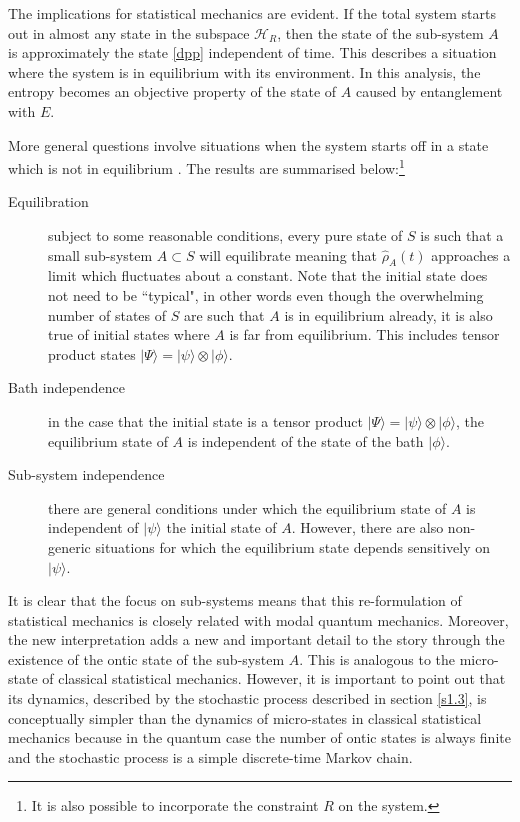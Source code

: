 \documentclass[%
preprint,
nofootinbib,
 amsmath,amssymb,
aps,
]{revtex4-1}
\def\BA{A}
\def\BH{{\mathscr H}}
\def\ket#1{| #1\rangle}
\begin{document}
The implications for statistical mechanics are evident. If the total system starts out in almost any state in the subspace $\BH_R$, then the state of the sub-system $\BA$ is approximately the state \eqref{dpp} independent of time. This describes a situation where the system is in equilibrium with its environment. In this analysis, the entropy becomes an objective property of the state of $\BA$ caused by entanglement with $E$. 

More general questions involve situations when the system starts off in a state which is not in equilibrium \cite{LPSW,Sh}. The results are summarised below:\footnote{It is also possible to incorporate the constraint $R$ on the system.}
\begin{description}
\item[Equilibration] subject to some reasonable conditions, every pure state of $S$ is such that a small sub-system $A\subset S$ will equilibrate meaning that $\hat\rho_A(t)$ approaches a limit which fluctuates about a constant. Note that the initial state does not need to be ``typical", in other words even though the overwhelming number of states of $S$ are such that $A$ is in equilibrium already, it is also true of initial states where $A$ is far from equilibrium. This includes tensor product
states $\ket{\Psi}=\ket{\psi}\otimes\ket{\phi}$.
\item[Bath independence] in the case that the initial state is a tensor product $\ket{\Psi}=\ket{\psi}\otimes\ket{\phi}$, the equilibrium state of $A$ is independent of the state of the bath $\ket{\phi}$.
\item[Sub-system independence] there are general conditions under which the equilibrium state of $A$ is independent of $\ket{\psi}$ the initial state of $A$. However, there are also non-generic situations for which the equilibrium state depends sensitively on $\ket{\psi}$.
\end{description}
It is clear that the focus on sub-systems means that this re-formulation of statistical mechanics is closely related with modal quantum mechanics. Moreover, the new interpretation  adds a new and important detail to the story through the existence of the ontic state of the sub-system $A$.
This is analogous to the micro-state of classical statistical mechanics. However, it is important to point out that its dynamics, described by the stochastic process described in section \ref{s1.3}, is conceptually simpler than the dynamics of micro-states in classical statistical mechanics because in the quantum case the number of ontic states is always finite and the stochastic process is a simple discrete-time Markov chain.
\end{document}
